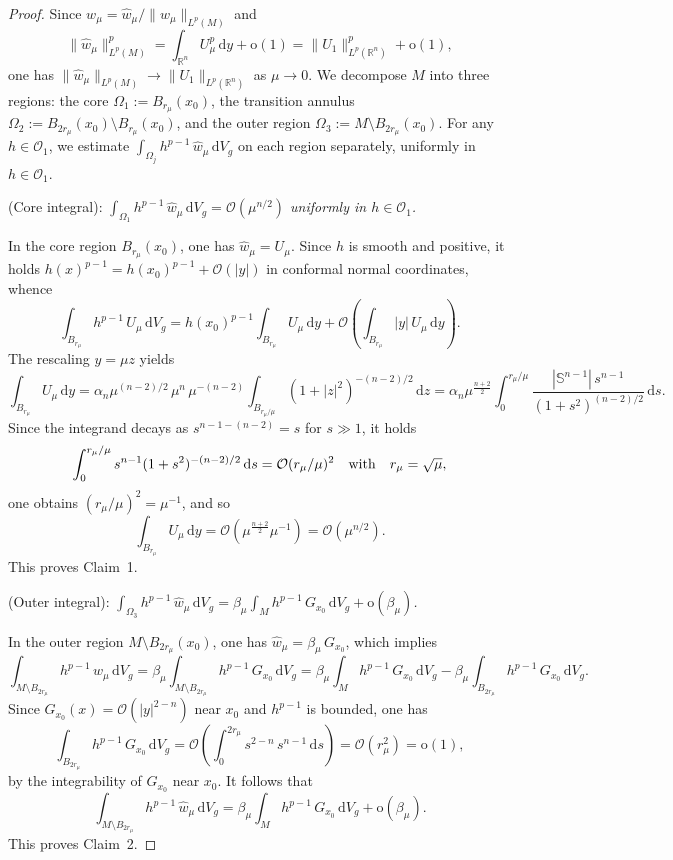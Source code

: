 \documentclass[reqno,11pt]{amsart}
\numberwithin{equation}{section}
\theoremstyle{definition}
\theoremstyle{remark}
\newcommand{\ud}{\,\mathrm{d}}
\newcommand{\R}{\mathbb{R}}
\newcommand{\Ss}{\mathbb{S}}
\begin{document}
\begin{proof}
Since $w_\mu = \hat{w}_\mu / \|\hat{w}_\mu\|_{L^p(M)}$ and
\[
\|\hat{w}_\mu\|_{L^p(M)}^p = \int_{\R^n} U_\mu^p \ud y + \mathrm{o}(1) = \|U_1\|_{L^p(\R^n)}^p + \mathrm{o}(1),\]
one has $\|\hat{w}_\mu\|_{L^p(M)} \to \|U_1\|_{L^p(\R^n)}$ as $\mu \to 0$. We decompose $M$ into three regions: the core $\Omega_1 := B_{r_\mu}(x_0)$, the transition annulus $\Omega_2 := B_{2r_\mu}(x_0) \setminus B_{r_\mu}(x_0)$, and the outer region $\Omega_3 := M \setminus B_{2r_\mu}(x_0)$. For any $h \in \mathscr{O}_1$, we estimate $\int_{\Omega_j} h^{p-1}\, \hat{w}_\mu \ud V_g$ on each region separately, uniformly in $h \in \mathscr O_1$.

\medskip
{} {\rm (Core integral):} {\it $\int_{\Omega_1} h^{p-1}\, \hat{w}_\mu \ud V_g = \mathcal{O}(\mu^{n/2})$ uniformly in $h \in \mathscr{O}_1$.}

\smallskip
{} In the core region $B_{r_\mu}(x_0)$, one has $\hat{w}_\mu = U_\mu$. Since $h$ is smooth and positive, it holds $h(x)^{p-1} = h(x_0)^{p-1} + \mathcal{O}(|y|)$ in conformal normal coordinates, whence
\[
\int_{B_{r_\mu}} h^{p-1}\, U_\mu \ud V_g = h(x_0)^{p-1} \int_{B_{r_\mu}} U_\mu \ud y + \mathcal{O}\!\left(\int_{B_{r_\mu}} |y|\, U_\mu \ud y\right).
\]
The rescaling $y = \mu z$ yields
\[
\int_{B_{r_\mu}} U_\mu \ud y = \alpha_n \mu^{(n-2)/2}\, \mu^n\, \mu^{-(n-2)} \int_{B_{r_\mu/\mu}} (1 + |z|^2)^{-(n-2)/2} \ud z = \alpha_n \mu^\frac{n+2}{2}\int_0^{r_\mu/\mu} \frac{|\Ss^{n-1}|\, s^{n-1}}{(1 + s^2)^{(n-2)/2}} \ud s.
\]
Since the integrand decays as $s^{n-1-(n-2)} = s$ for $s \gg 1$, it holds
\[
\int_0^{r_\mu/\mu} s^{n-1}(1+s^2)^{-(n-2)/2} \ud s=\mathcal{O}(r_\mu/\mu)^2 \quad {\rm with} \quad r_\mu = \sqrt{\mu},
\]
one obtains $(r_\mu/\mu)^2 = \mu^{-1}$, and so
\[
\int_{B_{r_\mu}} U_\mu \ud y = \mathcal{O}(\mu^\frac{n+2}{2} \mu^{-1}) = \mathcal{O}(\mu^{n/2}).
\]
This proves Claim~1.

\medskip
{} {\rm (Outer integral):} {\it $\int_{\Omega_3} h^{p-1}\, \hat{w}_\mu \ud V_g = \beta_\mu \int_M h^{p-1}\, G_{x_0} \ud V_g + \mathrm{o}(\beta_\mu)$.}

\smallskip
{} In the outer region $M \setminus B_{2r_\mu}(x_0)$, one has $\hat{w}_\mu = \beta_\mu\, G_{x_0}$, which implies
\[
\int_{M \setminus B_{2r_\mu}} h^{p-1}\, \hat{w}_\mu \ud V_g = \beta_\mu \int_{M \setminus B_{2r_\mu}} h^{p-1}\, G_{x_0} \ud V_g = \beta_\mu \int_M h^{p-1}\, G_{x_0} \ud V_g - \beta_\mu \int_{B_{2r_\mu}} h^{p-1}\, G_{x_0} \ud V_g.
\]
Since $G_{x_0}(x) = \mathcal{O}(|y|^{2-n})$ near $x_0$ and $h^{p-1}$ is bounded, one has
\[
\int_{B_{2r_\mu}} h^{p-1}\, G_{x_0} \ud V_g = \mathcal{O}\!\left(\int_0^{2r_\mu} s^{2-n}\, s^{n-1} \ud s\right) = \mathcal{O}(r_\mu^2) = \mathrm{o}(1),
\]
by the integrability of $G_{x_0}$ near $x_0$. It follows that
\[
\int_{M \setminus B_{2r_\mu}} h^{p-1}\, \hat{w}_\mu \ud V_g = \beta_\mu \int_M h^{p-1}\, G_{x_0} \ud V_g + \mathrm{o}(\beta_\mu).
\]
This proves Claim~2.


\end{proof}
\end{document}
